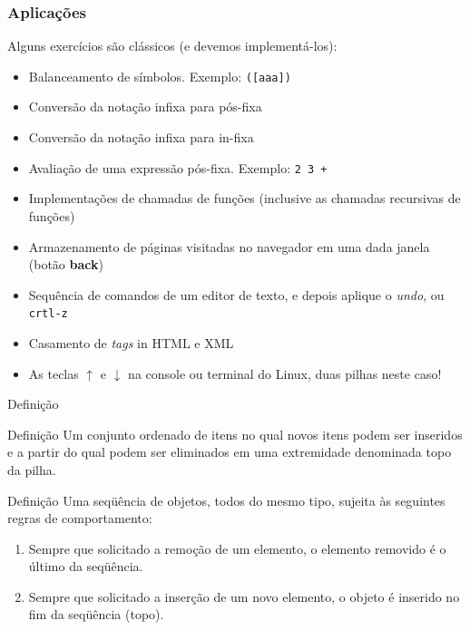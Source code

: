   
   \begin{frame}
   \frametitle{Aplicações}


\begin{block}{Alguns exercícios são clássicos (e devemos implementá-los):}

   \begin{itemize}
     \item Balanceamento de símbolos. Exemplo: \texttt{([aaa])}
     \item Conversão da notação infixa para pós-fixa
     \item Conversão da notação infixa para in-fixa
     \item Avaliação de uma expressão pós-fixa. Exemplo: \texttt{2 3 +}
     \item Implementações de chamadas de funções (inclusive as chamadas recursivas de funções)
     \item Armazenamento de páginas visitadas no  navegador em uma dada janela (botão \textbf{back})
     \item Sequência de comandos de um editor de texto, e depois aplique  o \textit{undo}, ou \texttt{crtl-z}
     \item Casamento de \textit{tags} in HTML e XML
     \item As teclas $\uparrow $ e $\downarrow $ na console ou terminal do Linux, duas pilhas neste caso!
     
   \end{itemize}

\end{block}
  
  
  
  \end{frame}
  
  
  
  
   \begin{frame}{Definição}
     \begin{block}{Definição}
       Um conjunto ordenado de itens no qual novos itens podem ser 
       inseridos e a partir do qual podem ser eliminados em uma 
       extremidade denominada \alert{topo} da pilha.
     \end{block}
     \pause
     \begin{block}{Definição}
       Uma seqüência de objetos, todos do mesmo tipo, sujeita às
        seguintes regras de comportamento:       
				\begin{enumerate}
					\item Sempre que solicitado a remoção de um elemento, o elemento removido é o último da seqüência.
					\item Sempre que solicitado a inserção de um novo elemento, 
					       o objeto é inserido no fim da seqüência (\alert{topo}).
				\end{enumerate}
     \end{block}  
   \end{frame}
  

